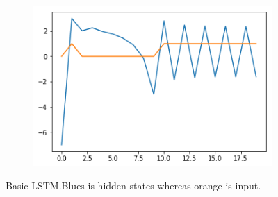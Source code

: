 \documentclass[12pt, letterpaper]{article}
\begin{document}
\begin{figure}[h]
\begin{subfigure}[b]{0.3\textwidth}
        \includegraphics[width=\textwidth]{basic3}
        \label{fig:mouse}
    \end{subfigure}
    \caption{Basic-LSTM.Blues is hidden states whereas orange is input.}\label{fig:animals}
\end{figure}
\end{document}

